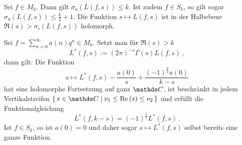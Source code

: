 \begin{koro}
Sei $f \in M_k$. Dann gilt $\sigma_a (L(f,s)) \leq k$. Ist zudem $f \in S_k$, so gilt sogar $\sigma_a (L(f,s)) \leq \frac k2 + 1$. Die Funktion $s \mapsto L(f,s)$ ist in der Halbebene $\Re(s) > \sigma_c (L(f,s))$ holomorph.
\end{koro}

\begin{satz}[Hecke]\label{satz:hecke}
Sei $f = \sum_{n=0}^\infty a(n) q^n \in M_k$. Setzt man für $\Re(s) > k$
\[
	L^*(f,s) := (2\pi)^{-s} \Gamma(s) L(f,s)
	\,,
\]
dann gilt: Die Funktion 
\[
	s \mapsto L^*(f,s) - \frac {a(0)}s + \frac {(-1)^{\frac k2} a(0)}{k-s}
\]
hat eine holomorphe Fortsetzung auf ganz $\CC$, ist beschränkt in jedem Vertikalstreifen $\Set {s \in \CC \mid \nu_1 \leq \Re(s) \leq \nu_2}$ und erfüllt die Funktionalgleichung
\[
	L^*(f,k-s) = (-1)^{\frac k2} L^*(f,s)
	\,.
\]
Ist $f \in S_k$, so ist $a(0) = 0$ und daher sogar $s \mapsto L^*(f,s)$ selbst bereits eine ganze Funktion.
\end{satz}

